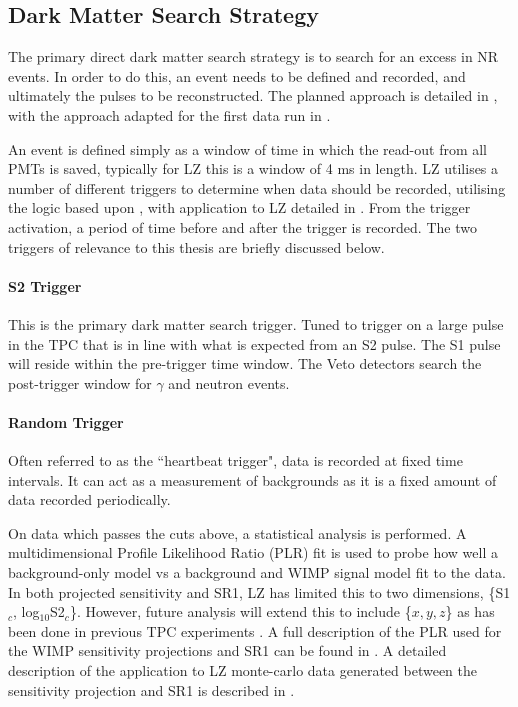 \subsection{Dark Matter Search Strategy}
\par
The primary direct dark matter search strategy is to search for an excess in NR events.
In order to do this, an event needs to be defined and recorded, and ultimately the pulses to be reconstructed.
The planned approach is detailed in \cite{LZ_TechnicalDesignReview_ref}, with the approach adapted for the first data run in \cite{lz_ws_sr1_ref}.

\par
An event is defined simply as a window of time in which the read-out from all PMTs is saved, typically for LZ this is a window of 4 ms in length.
LZ utilises a number of different triggers to determine when data should be recorded, utilising the logic based upon \cite{lux_trigger_logic_ref}, with application to LZ detailed in \cite{nicolasangelides_thesis_ref}.
From the trigger activation, a period of time before and after the trigger is recorded.
The two triggers of relevance to this thesis are briefly discussed below.

\paragraph{S2 Trigger}
\par
This is the primary dark matter search trigger.
Tuned to trigger on a large pulse in the TPC that is in line with what is expected from an S2 pulse.
The S1 pulse will reside within the pre-trigger time window.
The Veto detectors search the post-trigger window for $\gamma$ and neutron events.

\paragraph{Random Trigger}
Often referred to as the ``heartbeat trigger", data is recorded at fixed time intervals.
It can act as a measurement of backgrounds as it is a fixed amount of data recorded periodically.

\par
On data which passes the cuts above, a statistical analysis is performed.
A multidimensional Profile Likelihood Ratio (PLR) fit is used to probe how well a background-only model vs a background and WIMP signal model fit to the data.
In both projected sensitivity and SR1, LZ has limited this to two dimensions, \{S1$_c$, log$_{10}$S2$_c$\}.
However, future analysis will extend this to include \{$x,y,z$\} as has been done in previous TPC experiments \cite{LUX_RUN1_EFT_2021,LUX_RUN4_EFT_2021,shaunalsum_thesis_ref}.
A full description of the PLR used for the WIMP sensitivity projections and SR1 can be found in \cite{LZ_Ibles_LZStats_Thesis_ref}. 
A detailed description of the application to LZ monte-carlo data generated between the sensitivity projection and SR1 is described in \cite{jonathannikoleyczik_thesis_ref}.

